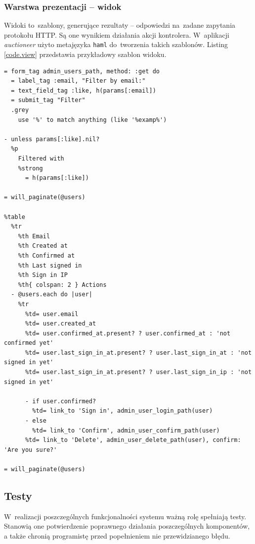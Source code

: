 \subsubsection{Warstwa prezentacji -- widok}

Widoki to~szablony, generujące rezultaty -- odpowiedzi na~zadane zapytania protokołu HTTP. Są one wynikiem działania akcji kontrolera. W~aplikacji \textit{auctioneer} użyto metajęzyka \texttt{haml} do~tworzenia takich szablonów. Listing \ref{code.view} przedstawia przykładowy szablon widoku.

\begin{lstlisting}[label={code.view}]
= form_tag admin_users_path, method: :get do
  = label_tag :email, "Filter by email:"
  = text_field_tag :like, h(params[:email])
  = submit_tag "Filter"
  .grey
    use '%' to match anything (like '%examp%')

- unless params[:like].nil?
  %p
    Filtered with
    %strong
      = h(params[:like])

= will_paginate(@users)

%table
  %tr
    %th Email
    %th Created at
    %th Confirmed at
    %th Last signed in
    %th Sign in IP
    %th{ colspan: 2 } Actions
  - @users.each do |user|
    %tr
      %td= user.email
      %td= user.created_at
      %td= user.confirmed_at.present? ? user.confirmed_at : 'not confirmed yet'
      %td= user.last_sign_in_at.present? ? user.last_sign_in_at : 'not signed in yet'
      %td= user.last_sign_in_at.present? ? user.last_sign_in_ip : 'not signed in yet'

      - if user.confirmed?
        %td= link_to 'Sign in', admin_user_login_path(user)
      - else
        %td= link_to 'Confirm', admin_user_confirm_path(user)
      %td= link_to 'Delete', admin_user_delete_path(user), confirm: 'Are you sure?'

= will_paginate(@users)
\end{lstlisting}

\subsection{Testy}

W~realizacji poszczególnych funkcjonalności systemu ważną rolę spełniają testy. Stanowią one potwierdzenie poprawnego działania poszczególnych komponentów, a także chronią programistę przed popełnieniem nie przewidzianego błędu.

